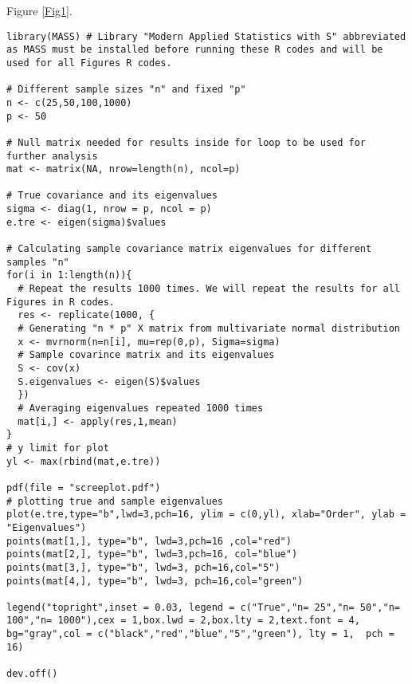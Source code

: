 Figure \ref{Fig1}.
\begin{lstlisting}
library(MASS) # Library "Modern Applied Statistics with S" abbreviated as MASS must be installed before running these R codes and will be used for all Figures R codes.  
 
# Different sample sizes "n" and fixed "p"
n <- c(25,50,100,1000)
p <- 50

# Null matrix needed for results inside for loop to be used for further analysis
mat <- matrix(NA, nrow=length(n), ncol=p)

# True covariance and its eigenvalues
sigma <- diag(1, nrow = p, ncol = p)
e.tre <- eigen(sigma)$values

# Calculating sample covariance matrix eigenvalues for different samples "n"
for(i in 1:length(n)){
  # Repeat the results 1000 times. We will repeat the results for all Figures in R codes. 
  res <- replicate(1000, {
  # Generating "n * p" X matrix from multivariate normal distribution 
  x <- mvrnorm(n=n[i], mu=rep(0,p), Sigma=sigma)
  # Sample covarince matrix and its eigenvalues
  S <- cov(x)
  S.eigenvalues <- eigen(S)$values
  })
  # Averaging eigenvalues repeated 1000 times
  mat[i,] <- apply(res,1,mean)
}
# y limit for plot
yl <- max(rbind(mat,e.tre))

pdf(file = "screeplot.pdf") 
# plotting true and sample eigenvalues
plot(e.tre,type="b",lwd=3,pch=16, ylim = c(0,yl), xlab="Order", ylab = "Eigenvalues")
points(mat[1,], type="b", lwd=3,pch=16 ,col="red")
points(mat[2,], type="b", lwd=3,pch=16, col="blue")
points(mat[3,], type="b", lwd=3, pch=16,col="5")
points(mat[4,], type="b", lwd=3, pch=16,col="green")

legend("topright",inset = 0.03, legend = c("True","n= 25","n= 50","n= 100","n= 1000"),cex = 1,box.lwd = 2,box.lty = 2,text.font = 4, bg="gray",col = c("black","red","blue","5","green"), lty = 1,  pch = 16)

dev.off()
\end{lstlisting}


